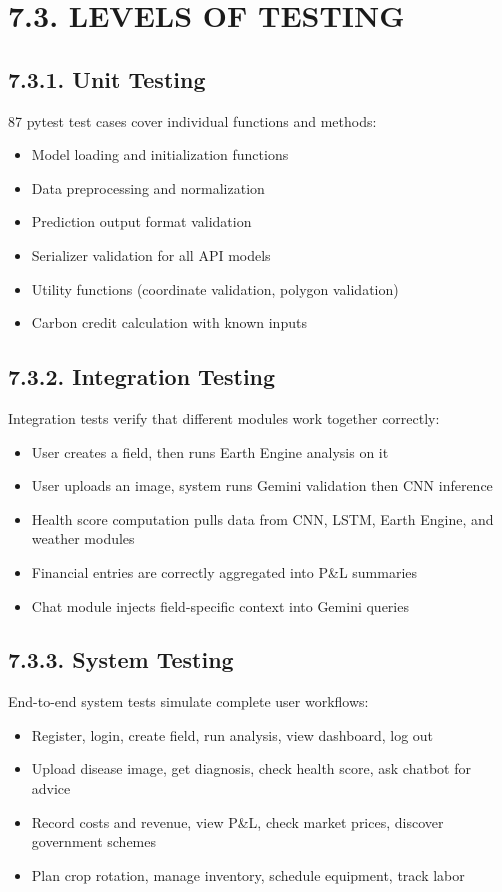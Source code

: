 \documentclass[12pt, a4paper]{report}
\begin{document}
\section{7.3. LEVELS OF TESTING}
\subsection{7.3.1. Unit Testing}
87 pytest test cases cover individual functions and methods:

\begin{itemize}[leftmargin=*]
  \item Model loading and initialization functions
  \item Data preprocessing and normalization
  \item Prediction output format validation
  \item Serializer validation for all API models
  \item Utility functions (coordinate validation, polygon validation)
  \item Carbon credit calculation with known inputs
\end{itemize}
\subsection{7.3.2. Integration Testing}
Integration tests verify that different modules work together correctly:

\begin{itemize}[leftmargin=*]
  \item User creates a field, then runs Earth Engine analysis on it
  \item User uploads an image, system runs Gemini validation then CNN inference
  \item Health score computation pulls data from CNN, LSTM, Earth Engine, and weather modules
  \item Financial entries are correctly aggregated into P\&L summaries
  \item Chat module injects field-specific context into Gemini queries
\end{itemize}
\subsection{7.3.3. System Testing}
End-to-end system tests simulate complete user workflows:

\begin{itemize}[leftmargin=*]
  \item Register, login, create field, run analysis, view dashboard, log out
  \item Upload disease image, get diagnosis, check health score, ask chatbot for advice
  \item Record costs and revenue, view P\&L, check market prices, discover government schemes
  \item Plan crop rotation, manage inventory, schedule equipment, track labor
\end{itemize}
\end{document}
